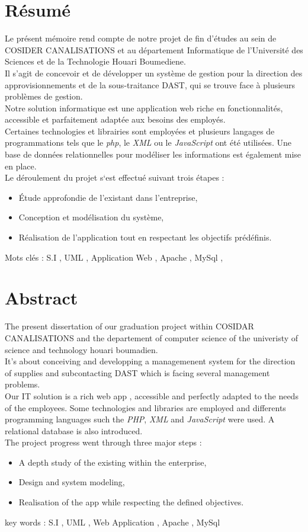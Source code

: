\documentclass{report}
\begin{document}
\chapter*{Résumé}
Le présent mémoire rend compte de notre projet de fin d’études au sein de COSIDER CANALISATIONS et au département Informatique de l’Université des Sciences et de la Technologie Houari Boumediene.\\ Il
s’agit de concevoir et de développer un système de gestion pour la direction des approvisionnements et de la sous-traitance DAST, qui se trouve face à plusieurs problèmes de gestion.\\
Notre solution informatique est une application web riche en fonctionnalités, accessible et parfaitement adaptée aux besoins des employés.\\
Certaines technologies et librairies sont employées et plusieurs langages de programmations tels que le \emph{php}, le \emph{XML} ou le \emph{JavaScript} ont été utilisées. Une base de données relationnelles pour modéliser les informations est également mise en place.\\
Le déroulement du projet s‘est effectué suivant trois étapes :
\begin{itemize}
    \item Étude approfondie de l'existant dans l'entreprise,
    \item Conception et modélisation du système,
    \item Réalisation de l'application tout en respectant les objectifs prédéfinis.
\end{itemize}
\vspace*{1cm}
Mots clés : S.I , UML , Application Web , Apache , MySql , 
\chapter*{Abstract}
The present dissertation of our graduation project within COSIDAR CANALISATIONS and the departement
of computer science of the univeristy of science and technology houari boumadien.\\
It’s about conceiving and developping a managemenent system for the direction of supplies and subcontacting DAST which is facing several management problems.\\
Our IT solution is a rich web app , accessible and perfectly adapted to the needs of the employees.
Some technologies and libraries are employed and differents programming languages such
the \emph{PHP}, \emph{XML} and \emph{JavaScript} were used. A relational database is also introduced.\\
The project progress went through three major steps :
\begin{itemize} 
       \item A depth study of the existing within the enterprise,
       \item Design and system modeling,
       \item Realisation of the app while respecting the defined objectives.
\end{itemize}
\vspace*{1cm}
key words : S.I , UML , Web Application , Apache , MySql
\end{document}
